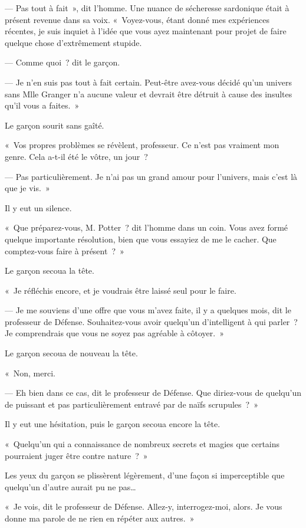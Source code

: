 --- Pas tout à fait~», dit l'homme.
Une nuance de sécheresse sardonique était à présent revenue dans sa voix.
«~Voyez-vous, étant donné mes expériences récentes, je suis inquiet à l'idée que vous ayez maintenant pour projet de faire quelque chose d'extrêmement stupide.

--- Comme quoi~? dit le garçon.

--- Je n'en suis pas tout à fait certain.
Peut-être avez-vous décidé qu'un univers sans Mlle Granger n'a aucune valeur et devrait être détruit à cause des insultes qu'il vous a faites.~»

Le garçon sourit sans gaîté.

«~Vos propres problèmes se révèlent, professeur.
Ce n'est pas vraiment mon genre.
Cela a-t-il été le vôtre, un jour~?

--- Pas particulièrement.
Je n'ai pas un grand amour pour l'univers, mais c'est là que je vis.~»

Il y eut un silence.

«~Que préparez-vous, M. Potter~? dit l'homme dans un coin.
Vous avez formé quelque importante résolution, bien que vous essayiez de me le cacher.
Que comptez-vous faire à présent~?~»

Le garçon secoua la tête.

«~Je réfléchis encore, et je voudrais être laissé seul pour le faire.

--- Je me souviens d'une offre que vous m'avez faite, il y a quelques mois, dit le professeur de Défense.
Souhaitez-vous avoir quelqu'un d'intelligent à qui parler~?
Je comprendrais que vous ne soyez pas agréable à côtoyer.~»

Le garçon secoua de nouveau la tête.

«~Non, merci.

--- Eh bien dans ce cas, dit le professeur de Défense.
Que diriez-vous de quelqu'un de puissant et pas particulièrement entravé par de naïfs scrupules~?~»

Il y eut une hésitation, puis le garçon secoua encore la tête.

«~Quelqu'un qui a connaissance de nombreux secrets et magies que certains pourraient juger être contre nature~?~»

Les yeux du garçon se plissèrent légèrement, d'une façon si imperceptible que quelqu'un d'autre aurait pu ne pas…

«~Je vois, dit le professeur de Défense.
Allez-y, interrogez-moi, alors.
Je vous donne ma parole de ne rien en répéter aux autres.~»

